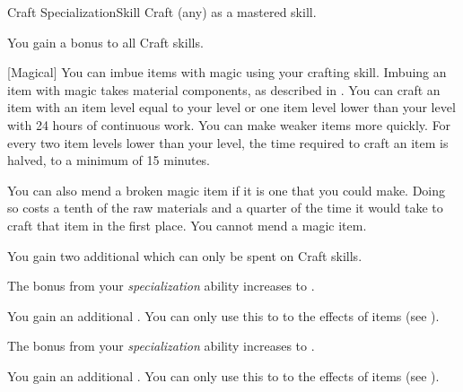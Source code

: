     \begin{feat}{Craft Specialization}{Skill}
        \featpre Craft (any) as a mastered skill.

         You gain a  bonus to all Craft skills.

        [Magical] You can imbue items with magic using your crafting skill.
        Imbuing an item with magic takes material components, as described in .
        You can craft an item with an item level equal to your level or one item level lower than your level with 24 hours of continuous work.
        You can make weaker items more quickly.
        For every two item levels lower than your level, the time required to craft an item is halved, to a minimum of 15 minutes.

        You can also mend a broken magic item if it is one that you could make.
        Doing so costs a tenth of the raw materials and a quarter of the time it would take to craft that item in the first place.
        You cannot mend a  magic item.

         You gain two additional  which can only be spent on Craft skills.

         The bonus from your \textit{specialization} ability increases to .

         You gain an additional .
        You can only use this  to  to the effects of items (see ).

         The bonus from your \textit{specialization} ability increases to .

         You gain an additional .
        You can only use this  to  to the effects of items (see ).
    \end{feat}

